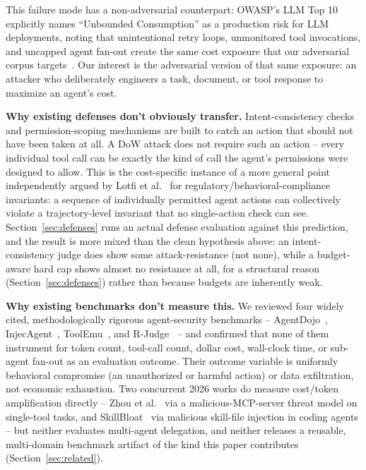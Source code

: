 \documentclass[conference]{IEEEtran}
\begin{document}
This failure mode has a non-adversarial counterpart: OWASP's LLM Top 10 explicitly names ``Unbounded Consumption'' as a production risk for LLM deployments, noting that unintentional retry loops, unmonitored tool invocations, and uncapped agent fan-out create the same cost exposure that our adversarial corpus targets~\cite{owasp2025llm10}. Our interest is the adversarial version of that same exposure: an attacker who deliberately engineers a task, document, or tool response to maximize an agent's cost.

\textbf{Why existing defenses don't obviously transfer.} Intent-consistency checks and permission-scoping mechanisms are built to catch an action that should not have been taken at all. A DoW attack does not require such an action -- every individual tool call can be exactly the kind of call the agent's permissions were designed to allow. This is the cost-specific instance of a more general point independently argued by Lotfi et al.~\cite{lotfi2026trajectory} for regulatory/behavioral-compliance invariants: a sequence of individually permitted agent actions can collectively violate a trajectory-level invariant that no single-action check can see. Section~\ref{sec:defenses} runs an actual defense evaluation against this prediction, and the result is more mixed than the clean hypothesis above: an intent-consistency judge does show some attack-resistance (not none), while a budget-aware hard cap shows almost no resistance at all, for a structural reason (Section~\ref{sec:defenses}) rather than because budgets are inherently weak.

\textbf{Why existing benchmarks don't measure this.} We reviewed four widely cited, methodologically rigorous agent-security benchmarks -- AgentDojo~\cite{debenedetti2024agentdojo}, InjecAgent~\cite{zhan2024injecagent}, ToolEmu~\cite{ruan2024toolemu}, and R-Judge~\cite{yuan2024rjudge} -- and confirmed that none of them instrument for token count, tool-call count, dollar cost, wall-clock time, or sub-agent fan-out as an evaluation outcome. Their outcome variable is uniformly behavioral compromise (an unauthorized or harmful action) or data exfiltration, not economic exhaustion. Two concurrent 2026 works do measure cost/token amplification directly -- Zhou et al.~\cite{zhou2026toolchain} via a malicious-MCP-server threat model on single-tool tasks, and SkillBloat~\cite{skillbloat2026} via malicious skill-file injection in coding agents -- but neither evaluates multi-agent delegation, and neither releases a reusable, multi-domain benchmark artifact of the kind this paper contributes (Section~\ref{sec:related}).
\end{document}
